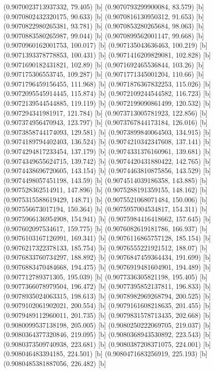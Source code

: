 {{{(0.9070023713937332, 79.405) [b] 
(0.9070793299900084, 83.579) [b] 
(0.9070802432320175, 90.633) [b] 
(0.9070816130950312, 91.653) [b] 
(0.9070822980265381, 93.781) [b] 
(0.9070853280265684, 98.063) [b] 
(0.9070883580265987, 99.044) [b] 
(0.9070899562001147, 99.668) [b] 
(0.9070960162001753, 100.017) [b] 
(0.907135043636463, 100.219) [b] 
(0.9071393378778853, 100.431) [b] 
(0.9071416209829081, 102.828) [b] 
(0.9071690182431821, 102.89) [b] 
(0.9071692465536844, 103.26) [b] 
(0.907175306553745, 109.287) [b] 
(0.9071771345001204, 110.66) [b] 
(0.9071796459156455, 111.968) [b] 
(0.9071876367832253, 115.026) [b] 
(0.9072095545914445, 115.874) [b] 
(0.9072109244544582, 116.723) [b] 
(0.9072139544544885, 119.119) [b] 
(0.9072199090861499, 120.532) [b] 
(0.907294341981917, 121.784) [b] 
(0.9073713005781923, 122.856) [b] 
(0.907374956470943, 123.797) [b] 
(0.9073767844173184, 126.016) [b] 
(0.9073858744174093, 129.581) [b] 
(0.9073899840064503, 134.915) [b] 
(0.9074189794402403, 136.524) [b] 
(0.9074210342347608, 137.141) [b] 
(0.9074294817233454, 137.179) [b] 
(0.9074331376160961, 139.681) [b] 
(0.9074349655624715, 139.742) [b] 
(0.9074420431880422, 142.765) [b] 
(0.9074438696720605, 143.154) [b] 
(0.9074463810875856, 143.529) [b] 
(0.9074498057451198, 143.59) [b] 
(0.9074514039186358, 143.885) [b] 
(0.907528362514911, 147.896) [b] 
(0.9075288191359155, 148.162) [b] 
(0.9075315588619429, 148.71) [b] 
(0.9075521068071484, 150.006) [b] 
(0.907556673017194, 150.364) [b] 
(0.9075957004534817, 154.311) [b] 
(0.9075966136954908, 154.941) [b] 
(0.9075984416418662, 157.645) [b] 
(0.907602097534617, 159.775) [b] 
(0.9076082619181786, 166.937) [b] 
(0.9076103167126991, 169.341) [b] 
(0.9076116865757128, 185.154) [b] 
(0.9076217322378133, 185.754) [b] 
(0.9076555221921512, 188.07) [b] 
(0.9076833760734297, 188.892) [b] 
(0.9076847459364434, 191.699) [b] 
(0.9076883470484668, 194.475) [b] 
(0.9076919481604901, 194.489) [b] 
(0.907712789371305, 195.039) [b] 
(0.9077336305821198, 195.405) [b] 
(0.9077366078979504, 196.472) [b] 
(0.9077395852137811, 196.833) [b] 
(0.9078935024063315, 198.613) [b] 
(0.9078982969268794, 200.525) [b] 
(0.9079102061902021, 200.554) [b] 
(0.9079161608218635, 201.455) [b] 
(0.9079489112960011, 201.735) [b] 
(0.9079831578713435, 202.668) [b] 
(0.9080099537138198, 205.005) [b] 
(0.9080250222069705, 219.037) [b] 
(0.9080364377320846, 219.095) [b] 
(0.9080368943530892, 223.543) [b] 
(0.9080373509740938, 223.681) [b] 
(0.9080387208371075, 224.001) [b] 
(0.908046483394185, 224.501) [b] 
(0.9080471683256919, 225.193) [b] 
(0.9080485381887056, 226.482) [b] 
}}}
